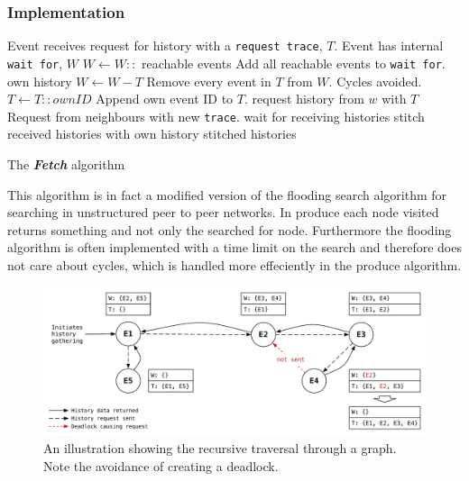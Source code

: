 	\subsubsection{Implementation}
	\begin{algorithm}
	\begin{algorithmic}
		\State Event receives request for history with a \texttt{request trace}, $T$.
		\State Event has internal \texttt{wait for}, $W$
		\State
		\State $W\gets W::$ reachable events \Comment Add all reachable events to \texttt{wait for}.
			\Return own history
		\Else
			\State $W\gets W-T$ \Comment Remove every event in $T$ from $W$. Cycles avoided.
			\State $T\gets T::ownID$ \Comment Append own event ID to $T$.
			\State
				\State request history from $w$ with $T$ \Comment Request from neighbours with new \texttt{trace}.
			\EndFor
			\State wait for receiving histories
			\State stitch received histories with own history
			\State
			\Return stitched histories
		\EndIf
	\end{algorithmic}
	\caption{The \textit{\textbf{Fetch}} algorithm}
	\label{alg:fetch}
	\end{algorithm}
	
	\newpar This algorithm is in fact a modified version of the flooding search algorithm for searching in unstructured peer to peer networks. In produce each node visited returns something and not only the searched for node. Furthermore the flooding algorithm is often implemented with a time limit on the search and therefore does not care about cycles, which is handled more effeciently in the produce algorithm.
	
	\begin{figure}[H]
		\centering
		\includegraphics[width=\textwidth]{4connect/images/recursive.pdf}
		\caption{An illustration showing the recursive traversal through a graph. Note the avoidance of creating a deadlock.}
		\label{fig:connecting:recursive}
	\end{figure}
	
